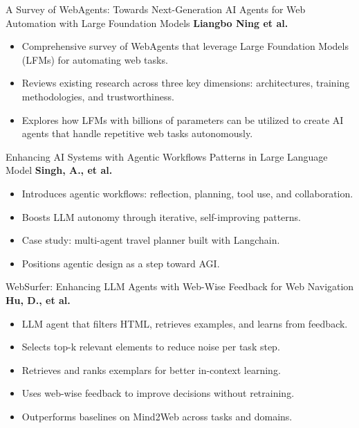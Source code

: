 \documentclass{beamer}
\begin{document}
\begin{frame}{A Survey of WebAgents: Towards Next-Generation AI Agents for Web Automation with Large Foundation Models }
\large\textbf{Liangbo Ning et al.}
\normalsize
\begin{itemize}
  \item Comprehensive survey of WebAgents that leverage Large Foundation Models (LFMs) for automating web tasks.
  \item Reviews existing research across three key dimensions: architectures, training methodologies, and trustworthiness.
  \item Explores how LFMs with billions of parameters can be utilized to create AI agents that handle repetitive web tasks autonomously.
\end{itemize}
\end{frame}

\begin{frame}{Enhancing AI Systems with Agentic Workflows 
Patterns in Large Language Model    }
\large\textbf{Singh, A., et al.}

\normalsize
\begin{itemize}
  \item Introduces agentic workflows: reflection, planning, tool use, and collaboration.
  \item Boosts LLM autonomy through iterative, self-improving patterns.
  \item Case study: multi-agent travel planner built with Langchain.
  \item Positions agentic design as a step toward AGI.
\end{itemize}
\end{frame}


\begin{frame}{WebSurfer: Enhancing LLM Agents with Web-Wise
 Feedback for Web Navigation }
\large\textbf{Hu, D., et al.}

\normalsize
\begin{itemize}
  \item LLM agent that filters HTML, retrieves examples, and learns from feedback.
  \item Selects top-k relevant elements to reduce noise per task step.
  \item Retrieves and ranks exemplars for better in-context learning.
  \item Uses web-wise feedback to improve decisions without retraining.
  \item Outperforms baselines on Mind2Web across tasks and domains.
\end{itemize}
\end{frame}
\end{document}

